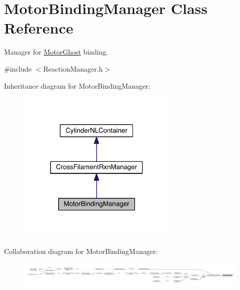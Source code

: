 \hypertarget{classMotorBindingManager}{\section{Motor\+Binding\+Manager Class Reference}
\label{classMotorBindingManager}
}


Manager for \hyperlink{classMotorGhost}{Motor\+Ghost} binding.  




{\ttfamily \#include $<$Reaction\+Manager.\+h$>$}



Inheritance diagram for Motor\+Binding\+Manager\+:\nopagebreak
\begin{figure}[H]
\begin{center}
\leavevmode
\includegraphics[width=218pt]{classMotorBindingManager__inherit__graph}
\end{center}
\end{figure}


Collaboration diagram for Motor\+Binding\+Manager\+:
\nopagebreak
\begin{figure}[H]
\begin{center}
\leavevmode
\includegraphics[width=350pt]{classMotorBindingManager__coll__graph}
\end{center}
\end{figure}
